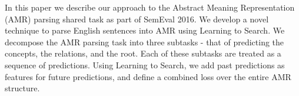 In this paper we describe our approach to the Abstract Meaning Representation (AMR) parsing shared task as part of SemEval 2016. We develop a novel technique to parse English sentences into AMR using Learning to Search. We decompose the AMR parsing task into three subtasks - that of predicting the concepts, the relations, and the root. Each of these subtasks are treated as a sequence of predictions. Using Learning to Search, we add past predictions as features for future predictions, and define a combined loss over the entire AMR structure.
